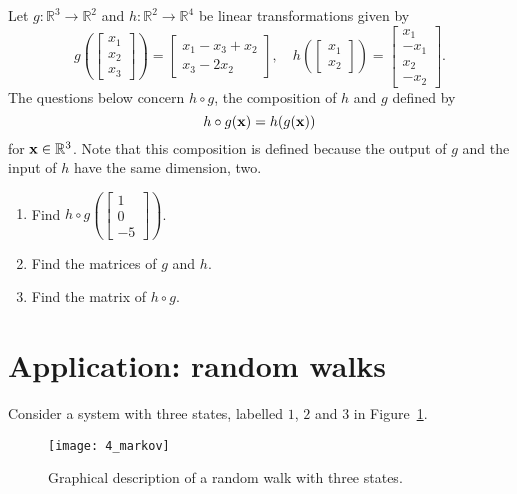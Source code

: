 \begin{problem}
\label{2009_a7_5}
Let $g:\mathbb{R}^3\to \mathbb{R}^2$ and $h:\mathbb{R}^2\to \mathbb{R}^4$ be linear transformations given by
$$
g\left(\left[\begin{array}{c}x_1\\ x_2\\ x_3 \end{array}\right]\right)=\left[\begin{array}{c}x_1-x_3+x_2\\ x_3-2x_2\end{array}\right],\quad
h\left(\left[\begin{array}{c}x_1\\ x_2 \end{array}\right]\right)=\left[\begin{array}{c}x_1\\ -x_1\\x_2\\ -x_2\end{array}\right].
$$
The questions below concern $h \circ g$, the composition of $h$ and $g$ defined
by
$$
h \circ g ({\bf x}) = h(g({\bf x}))
$$
for ${\bf x} \in \mathbb{R}^3$. Note that this composition is defined because
the output of $g$ and the input of $h$ have the same dimension, two.
    \begin{enumerate}
     \item Find $h \circ g\left(\left[\begin{array}{c}1\\0\\ -5 \end{array}\right]\right)$.
     \item Find  the matrices of $g$ and $h$.
     \item Find the matrix of $h \circ g$.
    \end{enumerate}
\end{problem}

\section{Application: random walks}
\label{s_random}

Consider a system with three states, labelled $1$, $2$ and $3$ in 
Figure~\ref{fig_markov}.

\begin{figure}
\centerline{\texttt{[image: 4\_markov]}}
\caption{Graphical description of a random walk with three states.
\label{fig_markov}}
\end{figure}


